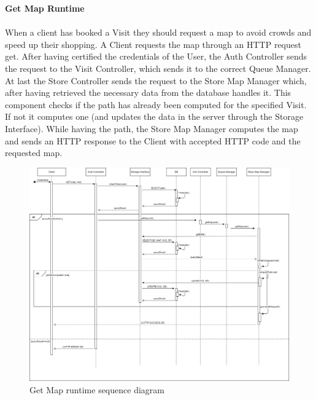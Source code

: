 \documentclass[a4paper, 12pt, oneside, table]{article}
\begin{document}
\textbf{Get Map Runtime}\\
\\
When a client has booked a Visit they should request a map to avoid crowds and speed up their shopping. 
A Client requests the map through an HTTP request get. After having certified the credentials of the User, the Auth Controller sends the request to the Visit Controller, which sends it to the correct Queue Manager. At last the Store Controller sends the request to the Store Map Manager which, after having retrieved the necessary data from the database handles it. This component checks if the path has already been computed for the specified Visit. If not it computes one (and updates the data in the server through the Storage Interface).  While having the path, the Store Map Manager computes the map and sends an HTTP response to the Client with accepted HTTP code and the requested map.
\begin{figure}[H]
\centering
	\centering
  	\includegraphics[height=0.5\textheight, scale=0.5, keepaspectratio]{img/seq_diag/GetMap_RuntimeView.jpg}
	\caption{Get Map runtime sequence diagram}
 	\label{getMapRunTime}
\end{figure}
\end{document}
